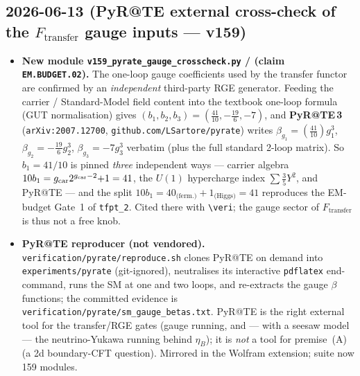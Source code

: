 \subsection*{2026-06-13 (PyR@TE external cross-check of the $F_{\mathrm{transfer}}$ gauge inputs --- v159)}
\begin{itemize}
\item \textbf{New module \texttt{v159\_pyrate\_gauge\_crosscheck.py} \mE/\mC{} (claim
  \texttt{EM.BUDGET.02}).} The one-loop gauge coefficients used by the transfer functor
  are confirmed by an \emph{independent} third-party RGE generator. Feeding the carrier
  / Standard-Model field content into the textbook one-loop formula (GUT normalisation)
  gives $(b_1,b_2,b_3)=(\tfrac{41}{10},-\tfrac{19}{6},-7)$, and \textbf{PyR@TE\,3}
  (\texttt{arXiv:2007.12700}, \texttt{github.com/LSartore/pyrate}) writes
  $\beta_{g_1}=(\tfrac{41}{10})g_1^3$, $\beta_{g_2}=-\tfrac{19}{6}g_2^3$,
  $\beta_{g_3}=-7g_3^3$ verbatim (plus the full standard 2-loop matrix). So $b_1=41/10$
  is pinned \emph{three} independent ways --- carrier algebra
  $10b_1=g_{\mathrm{car}} 2^{g_{\mathrm{car}}-2}{+}1=41$, the $U(1)$ hypercharge index $\sum\tfrac35 Y^2$, and
  PyR@TE --- and the split $10b_1=40_{\text{(ferm.)}}+1_{\text{(Higgs)}}=41$ reproduces
  the EM-budget Gate~1 of \texttt{tfpt\_2}. Cited there with \texttt{\textbackslash veri};
  the gauge sector of $F_{\mathrm{transfer}}$ is thus not a free knob.
\item \textbf{PyR@TE reproducer (not vendored).} \texttt{verification/pyrate/reproduce.sh}
  clones PyR@TE on demand into \texttt{experiments/pyrate} (git-ignored), neutralises its
  interactive \texttt{pdflatex} end-command, runs the SM at one and two loops, and
  re-extracts the gauge $\beta$ functions; the committed evidence is
  \texttt{verification/pyrate/sm\_gauge\_betas.txt}. PyR@TE is the right external tool for
  the transfer/RGE gates (gauge running, and --- with a seesaw model --- the
  neutrino-Yukawa running behind $\eta_B$); it is \emph{not} a tool for premise~(A) (a
  2d boundary-CFT question). Mirrored in the Wolfram extension; suite now 159 modules.
\end{itemize}

